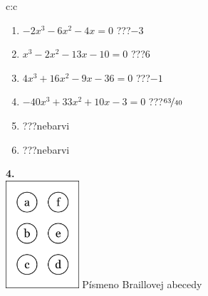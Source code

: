 \documentclass[10pt]{report}
\begin{document}
\begin{tabular}{c:c}
\begin{minipage}[c][104.5mm][t]{0.5\linewidth}
\begin{center}
\begin{minipage}{0.79\linewidth}
\begin{center}
\begin{varwidth}{\linewidth}
\begin{enumerate}
\Large
\item $-2x^3-6x^2-4x=0$\quad \dotfill\; ???\;\dotfill \quad $-3$
\item $x^3-2x^2-13x-10=0$\quad \dotfill\; ???\;\dotfill \quad $6$
\item $4x^3+16x^2-9x-36=0$\quad \dotfill\; ???\;\dotfill \quad $-1$
\item $-40x^3+33x^2+10x-3=0$\quad \dotfill\; ???\;\dotfill \quad $\nicefrac{63}{40}$
\item \quad \dotfill\; ???\;\dotfill \quad nebarvi
\item \quad \dotfill\; ???\;\dotfill \quad nebarvi
\end{enumerate}
\end{varwidth}
\end{center}
\end{minipage}
\begin{minipage}{0.20\linewidth}
\begin{center}
{\Huge\bfseries 4.} \\[2mm]
\includegraphics[height=40mm]{../images/braille.png}
{\small Písmeno Braillovej abecedy}
\end{center}
\end{minipage}
\end{center}
\end{minipage}
%
\end{tabular}
\newpage
\thispagestyle{empty}
\end{document}
